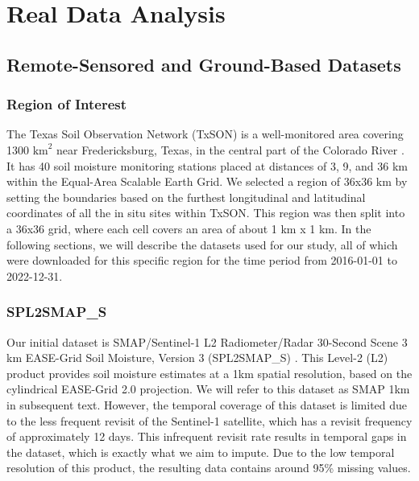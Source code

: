 \documentclass[11pt]{article}
\begin{document}
\section{Real Data Analysis}
\subsection{Remote-Sensored and Ground-Based Datasets}

\subsubsection*{Region of Interest}

The Texas Soil Observation Network (TxSON) is a well-monitored area covering 1300 $\text{km}^2$ near Fredericksburg, Texas, in the central part of the Colorado River \citep{caldwell2019texas}. It has 40 soil moisture monitoring stations placed at distances of 3, 9, and 36 km within the Equal-Area Scalable Earth Grid. We selected a region of 36x36 km by setting the boundaries based on the furthest longitudinal and latitudinal coordinates of all the in situ sites within TxSON. This region was then split into a 36x36 grid, where each cell covers an area of about 1 km x 1 km. 
In the following sections, we will describe the datasets used for our study, all of which were downloaded for this specific region for the time period from 2016-01-01 to 2022-12-31.

\subsubsection*{SPL2SMAP\_S}
Our initial dataset is SMAP/Sentinel-1 L2 Radiometer/Radar 30-Second Scene 3 km EASE-Grid Soil Moisture, Version 3 (SPL2SMAP\_S) \citep{das2019smap}. This Level-2 (L2) product provides soil moisture estimates at a 1km spatial resolution, based on the cylindrical EASE-Grid 2.0 \citep{brodzik2012ease} projection. We will refer to this dataset as SMAP 1km in subsequent text. However, the temporal coverage of this dataset is limited due to the less frequent revisit of the Sentinel-1 satellite, which has a revisit frequency of approximately 12 days. This infrequent revisit rate results in temporal gaps in the dataset, which is exactly what we aim to impute. Due to the low temporal resolution of this product, the resulting data contains around 95\% missing values.
\end{document}
